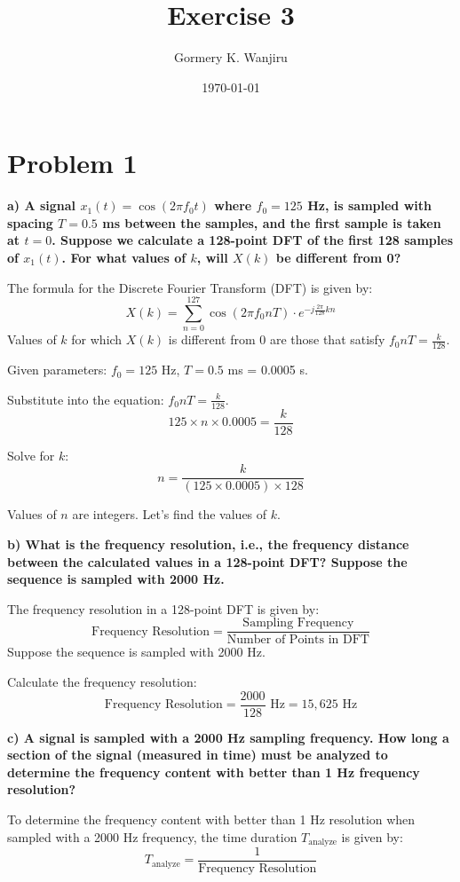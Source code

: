 \documentclass{article}
\title{Exercise 3}
\author{Gormery K. Wanjiru}
\date{\today}
\begin{document}
\maketitle
\section*{Problem 1}

\textbf{a) A signal \(x_1(t) = \cos(2 \pi f_0 t)\) where \(f_0 = 125\) Hz, is sampled with spacing \(T = 0.5\) ms between the samples, and the first sample is taken at \(t = 0\). Suppose we calculate a 128-point DFT of the first 128 samples of \(x_1(t)\). For what values of \(k\), will \(X(k)\) be different from 0?}

The formula for the Discrete Fourier Transform (DFT) is given by:
\[ X(k) = \sum_{n=0}^{127} \cos(2 \pi f_0 n T) \cdot e^{-j \frac{2\pi}{128}kn} \]
Values of \(k\) for which \(X(k)\) is different from 0 are those that satisfy \(f_0 n T = \frac{k}{128}\).

Given parameters: \(f_0 = 125\) Hz, \(T = 0.5\) ms = 0.0005 s.

Substitute into the equation: \(f_0 n T = \frac{k}{128}\).
\[ 125 \times n \times 0.0005 = \frac{k}{128} \]

Solve for \(k\):
\[ n = \frac{k}{(125 \times 0.0005) \times 128} \]

Values of \(n\) are integers. Let's find the values of \(k\). 

\textbf{b) What is the frequency resolution, i.e., the frequency distance between the calculated values in a 128-point DFT? Suppose the sequence is sampled with 2000 Hz.}

The frequency resolution in a 128-point DFT is given by:
\[ \text{Frequency Resolution} = \frac{\text{Sampling Frequency}}{\text{Number of Points in DFT}} \]
Suppose the sequence is sampled with 2000 Hz.

Calculate the frequency resolution:
\[ \text{Frequency Resolution} = \frac{2000}{128} \text{ Hz} = 15,625 \text{ Hz} \]

\textbf{c) A signal is sampled with a 2000 Hz sampling frequency. How long a section of the signal (measured in time) must be analyzed to determine the frequency content with better than 1 Hz frequency resolution?}

To determine the frequency content with better than 1 Hz resolution when sampled with a 2000 Hz frequency, the time duration \(T_{\text{analyze}}\) is given by:
\[ T_{\text{analyze}} = \frac{1}{\text{Frequency Resolution}} \]
\end{document}
